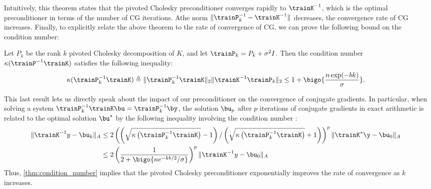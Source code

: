 %
Intuitively, this theorem states that the pivoted Cholesky preconditioner converges rapidly to $\trainK^{-1}$, which is the optimal preconditioner in terms of the number of CG iterations.
Athe norm $\Vert \trainP_{k}^{-1} - \trainK^{-1} \Vert$ decreases, the convergence rate of CG increases.
Finally, to explicitly relate the above theorem to the rate of convergence of CG, we can prove the following bound on the condition number:
%
\begin{theorem}
  \label{thm:condition_number}
  Let $P_{k}$ be the rank $k$ pivoted Cholesky decomposition of $K$, and let $\trainP_{k} = P_{k} + \sigma^{2}I$. Then the condition number $\kappa(\trainP^{-1}\trainK)$ satisfies the following inequality:
  \begin{equation}
    \kappa(\trainP_{k}^{-1}\trainK) \triangleq \Vert \trainP_{k}^{-1}\trainK \Vert_{2} \Vert \trainK^{-1}\trainP_{k} \Vert_{2} \leq 1 + \bigo{\frac{n\exp(-bk)}{\sigma}}.
  \end{equation}
\end{theorem}
%
This last result lets us directly speak about the impact of our preconditioner on the convergence of conjugate gradients.
In particular, when solving a system $\trainP_{k}^{-1}\trainK\bu = \trainP_{k}^{-1}\by$, the solution $\bu_{p}$ after $p$ iterations of conjugate gradients in exact arithmetic is related to the optimal solution $\bu^{*}$ by the following inequality involving the condition number :
%
\begin{equation}
  \begin{aligned}
  \Vert \trainK^{-1} y - \bu_{k} \Vert_{A}
  &\leq 2 \left( \left( {\sqrt{\kappa\left(\trainP_{k}^{-1}\trainK\right)} - 1} \right) / \left( {\sqrt{\kappa\left(\trainP_{k}^{-1}\trainK\right)} + 1} \right) \right)^{p}\Vert \trainK^{*}\y - \bu_{0} \Vert_{A}
  \\
  &\leq 2 \left(\frac{1}{2 + \bigo{n e^{-kb/2} / \sigma}}\right)^{p}\Vert \trainK^{-1} y - \bu_{0} \Vert_{A}
\end{aligned}
\end{equation}
%
Thus, \autoref{thm:condition_number} implies that the pivoted Cholesky preconditioner exponentially improves the rate of convergence as $k$ increases.
